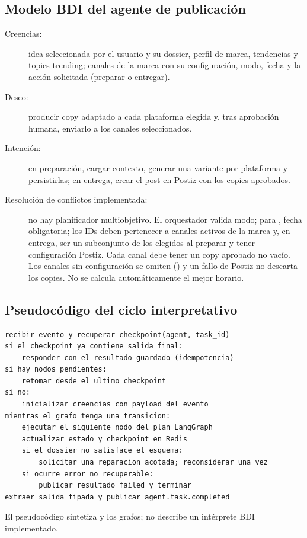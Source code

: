 \documentclass[12pt,oneside]{report}
\newcommand{\code}[1]{\texttt{\detokenize{#1}}}
\begin{document}
\subsection{Modelo BDI del agente de publicación}
\begin{description}
  \item[Creencias:] idea seleccionada por el usuario y su dossier, perfil de marca, tendencias y topics trending; canales de la marca con su configuración, modo, fecha y la acción solicitada (preparar o entregar).
  \item[Deseo:] producir copy adaptado a cada plataforma elegida y, tras aprobación humana, enviarlo a los canales seleccionados.
  \item[Intención:] en preparación, cargar contexto, generar una variante por plataforma y persistirlas; en entrega, crear el post en Postiz con los copies aprobados.
  \item[Resolución de conflictos implementada:] no hay planificador multiobjetivo. El orquestador valida modo; para \code{schedule}, fecha obligatoria; los IDs deben pertenecer a canales activos de la marca y, en entrega, ser un subconjunto de los elegidos al preparar y tener configuración Postiz. Cada canal debe tener un copy aprobado no vacío. Los canales sin configuración se omiten (\code{skipped}) y un fallo de Postiz no descarta los copies. No se calcula automáticamente el mejor horario.
\end{description}

\subsection{Pseudocódigo del ciclo interpretativo}
\begin{lstlisting}
recibir evento y recuperar checkpoint(agent, task_id)
si el checkpoint ya contiene salida final:
    responder con el resultado guardado (idempotencia)
si hay nodos pendientes:
    retomar desde el ultimo checkpoint
si no:
    inicializar creencias con payload del evento
mientras el grafo tenga una transicion:
    ejecutar el siguiente nodo del plan LangGraph
    actualizar estado y checkpoint en Redis
    si el dossier no satisface el esquema:
        solicitar una reparacion acotada; reconsiderar una vez
    si ocurre error no recuperable:
        publicar resultado failed y terminar
extraer salida tipada y publicar agent.task.completed
\end{lstlisting}
El pseudocódigo sintetiza \code{common/agent_runner.py} y los grafos; no describe un intérprete BDI implementado.
\end{document}
